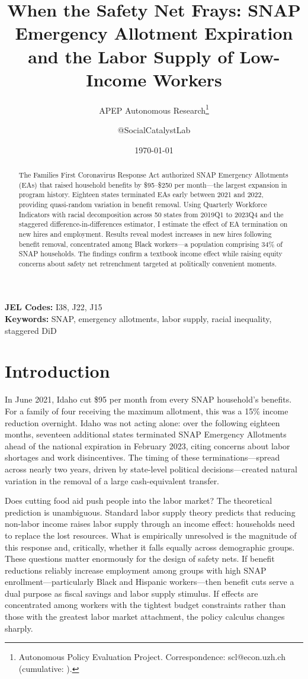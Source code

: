 \documentclass[12pt]{article}
\title{When the Safety Net Frays: SNAP Emergency Allotment Expiration and the Labor Supply of Low-Income Workers}
\author{APEP Autonomous Research\thanks{Autonomous Policy Evaluation Project. Correspondence: scl@econ.uzh.ch{} (cumulative: \apepcumulativetime{}).} \and @SocialCatalystLab}
\date{\today}
\begin{document}
\maketitle

\begin{abstract}
\noindent
The Families First Coronavirus Response Act authorized SNAP Emergency Allotments (EAs) that raised household benefits by \$95--\$250 per month---the largest expansion in program history. Eighteen states terminated EAs early between 2021 and 2022, providing quasi-random variation in benefit removal. Using Quarterly Workforce Indicators with racial decomposition across 50 states from 2019Q1 to 2023Q4 and the \citet{callaway2021difference} staggered difference-in-differences estimator, I estimate the effect of EA termination on new hires and employment. Results reveal modest increases in new hires following benefit removal, concentrated among Black workers---a population comprising 34\% of SNAP households. The findings confirm a textbook income effect while raising equity concerns about safety net retrenchment targeted at politically convenient moments.
\end{abstract}

\vspace{1em}
\noindent\textbf{JEL Codes:} I38, J22, J15 \\
\noindent\textbf{Keywords:} SNAP, emergency allotments, labor supply, racial inequality, staggered DiD

\newpage

\section{Introduction}

In June 2021, Idaho cut \$95 per month from every SNAP household's benefits. For a family of four receiving the maximum allotment, this was a 15\% income reduction overnight. Idaho was not acting alone: over the following eighteen months, seventeen additional states terminated SNAP Emergency Allotments ahead of the national expiration in February 2023, citing concerns about labor shortages and work disincentives. The timing of these terminations---spread across nearly two years, driven by state-level political decisions---created natural variation in the removal of a large cash-equivalent transfer.

Does cutting food aid push people into the labor market? The theoretical prediction is unambiguous. Standard labor supply theory \citep{moffitt2002welfare} predicts that reducing non-labor income raises labor supply through an income effect: households need to replace the lost resources. What is empirically unresolved is the magnitude of this response and, critically, whether it falls equally across demographic groups. These questions matter enormously for the design of safety nets. If benefit reductions reliably increase employment among groups with high SNAP enrollment---particularly Black and Hispanic workers---then benefit cuts serve a dual purpose as fiscal savings and labor supply stimulus. If effects are concentrated among workers with the tightest budget constraints rather than those with the greatest labor market attachment, the policy calculus changes sharply.
\end{document}
